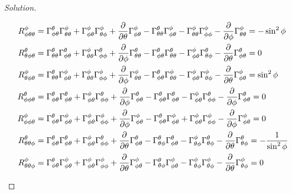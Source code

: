 \documentclass[a4paper]{article}
\begin{document}
\begin{proof}[Solution]
\begin{enumerate}
\[\begin{aligned}
      R_{\phi \theta \theta}^\phi &= \Gamma_{\phi \theta}^\theta \Gamma_{\theta \theta}^\phi + \Gamma_{\phi \theta}^\phi \Gamma_{\theta \phi}^\phi + \pdv{\theta} \Gamma_{\phi \theta}^\phi - \Gamma_{\theta \theta}^\theta \Gamma_{\phi \theta}^\phi  - \Gamma_{\theta \theta}^\phi \Gamma_{\phi \phi}^\phi - \pdv{\phi} \Gamma_{\theta \theta}^\phi = -\sin^2 \phi \\
      R_{\theta \phi \theta}^\theta &= \Gamma_{\theta \theta}^\theta \Gamma_{\phi \theta}^\theta + \Gamma_{\theta \theta}^\phi \Gamma_{\phi \phi}^\theta + \pdv{\phi} \Gamma_{\theta \theta}^\theta - \Gamma_{\phi \theta}^\theta \Gamma_{\theta \theta}^\theta  - \Gamma_{\phi \theta}^\phi \Gamma_{\theta \phi}^\theta - \pdv{\theta} \Gamma_{\phi \theta}^\theta = 0 \\
      R_{\theta \phi \theta}^\phi &= \Gamma_{\theta \theta}^\theta \Gamma_{\phi \theta}^\phi + \Gamma_{\theta \theta}^\phi \Gamma_{\phi \phi}^\phi + \pdv{\phi} \Gamma_{\theta \theta}^\phi - \Gamma_{\phi \theta}^\theta \Gamma_{\theta \theta}^\phi  - \Gamma_{\phi \theta}^\phi \Gamma_{\theta \phi}^\phi - \pdv{\theta} \Gamma_{\phi \theta}^\phi = \sin^2 \phi \\
      R_{\phi \phi \theta}^\theta &= \Gamma_{\phi \theta}^\theta \Gamma_{\phi \theta}^\theta + \Gamma_{\phi \theta}^\phi \Gamma_{\phi \phi}^\theta + \pdv{\phi} \Gamma_{\phi \theta}^\theta - \Gamma_{\phi \theta}^\theta \Gamma_{\phi \theta}^\theta  - \Gamma_{\phi \theta}^\phi \Gamma_{\phi \phi}^\theta - \pdv{\phi} \Gamma_{\phi \theta}^\theta = 0 \\
      R_{\phi \phi \theta}^\phi &= \Gamma_{\phi \theta}^\theta \Gamma_{\phi \theta}^\phi + \Gamma_{\phi \theta}^\phi \Gamma_{\phi \phi}^\phi + \pdv{\phi} \Gamma_{\phi \theta}^\phi - \Gamma_{\phi \theta}^\theta \Gamma_{\phi \theta}^\phi  + \Gamma_{\phi \theta}^\phi \Gamma_{\phi \phi}^\phi - \pdv{\phi} \Gamma_{\phi \theta}^\phi = 0 \\
      R_{\theta \theta \phi}^\theta &= \Gamma_{\phi \theta}^\theta \Gamma_{\phi \theta}^\theta + \Gamma_{\phi \theta}^\phi \Gamma_{\phi \phi}^\theta + \pdv{\theta} \Gamma_{\phi \theta}^\theta - \Gamma_{\theta \phi}^\theta \Gamma_{\phi \theta}^\theta  - \Gamma_{\theta \phi}^\phi \Gamma_{\theta \phi}^\theta - \pdv{\theta} \Gamma_{\theta \phi}^\theta = -\frac{1}{\sin^2 \phi} \\
      R_{\theta \theta \phi}^\phi &= \Gamma_{\phi \theta}^\theta \Gamma_{\phi \theta}^\phi + \Gamma_{\phi \theta}^\phi \Gamma_{\phi \phi}^\phi + \pdv{\theta} \Gamma_{\phi \theta}^\phi - \Gamma_{\theta \phi}^\theta \Gamma_{\phi \theta}^\phi  - \Gamma_{\theta \phi}^\phi \Gamma_{\theta \phi}^\phi - \pdv{\theta} \Gamma_{\theta \phi}^\phi =  0 \\

\end{aligned}\]
\end{enumerate}
\end{proof}
\end{document}
